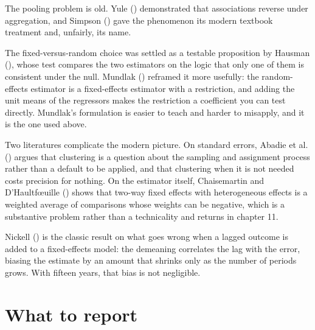 \documentclass[
  letterpaper,
  10pt,
  twoside,
  openright,
  numbers=noenddot,
  chapterprefix=true]{scrbook}
\begin{document}
\begin{qmiblit}

The pooling problem is old. Yule ()
demonstrated that associations reverse under aggregation, and Simpson
() gave the phenomenon its modern
textbook treatment and, unfairly, its name.

The fixed-versus-random choice was settled as a testable proposition by
Hausman (), whose test compares the two
estimators on the logic that only one of them is consistent under the
null. Mundlak () reframed it more
usefully: the random-effects estimator is a fixed-effects estimator with
a restriction, and adding the unit means of the regressors makes the
restriction a coefficient you can test directly. Mundlak's formulation
is easier to teach and harder to misapply, and it is the one used above.

Two literatures complicate the modern picture. On standard errors,
Abadie et al. () argues that clustering
is a question about the sampling and assignment process rather than a
default to be applied, and that clustering when it is not needed costs
precision for nothing. On the estimator itself, Chaisemartin and
D'Haultfœuille () shows that
two-way fixed effects with heterogeneous effects is a weighted average
of comparisons whose weights can be negative, which is a substantive
problem rather than a technicality and returns in chapter 11.

Nickell () is the classic result on what
goes wrong when a lagged outcome is added to a fixed-effects model: the
demeaning correlates the lag with the error, biasing the estimate by an
amount that shrinks only as the number of periods grows. With fifteen
years, that bias is not negligible.

\end{qmiblit}

\section{What to report}\label{what-to-report-4}
\end{document}
